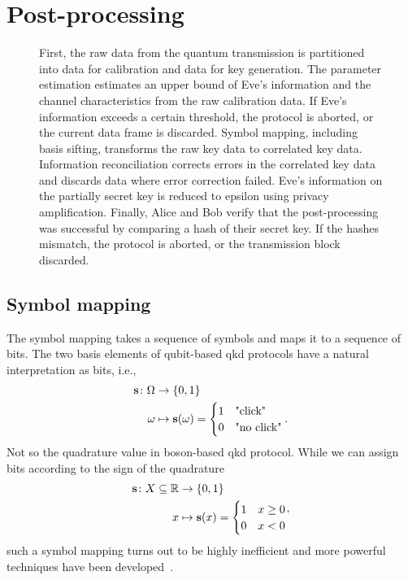 \section{Post-processing}

\begin{figure}[htb]
	\centering
	
	\caption{First, the raw data from the quantum transmission is partitioned into data for calibration and data for key generation. The parameter estimation estimates an upper bound of Eve's information and the channel characteristics from the raw calibration data. If Eve's information exceeds a certain threshold, the protocol is aborted, or the current data frame is discarded. Symbol mapping, including basis sifting, transforms the raw key data to correlated key data. Information reconciliation corrects errors in the correlated key data and discards data where error correction failed. Eve's information on the partially secret key is reduced to epsilon using privacy amplification. Finally, Alice and Bob verify that the post-processing was successful by comparing a hash of their secret key. If the hashes mismatch, the protocol is aborted, or the transmission block discarded.}\label{fig:post_processing}
\end{figure}

\FloatBarrier
\subsection{Symbol mapping}

The symbol mapping takes a sequence of symbols and maps it to a sequence of bits.
The two basis elements of qubit-based \gls{qkd} protocols have a natural interpretation as bits, i.e.,
\begin{equation}
	\begin{split}
		\vb{s}\colon\Omega&\to\{0,1\} \\
		\omega &\mapsto \vb{s}(\omega)
		=
		\begin{cases}
			1 & \text{"click"} \\
			0 & \text{"no click"}
		\end{cases}
		.
	\end{split}
\end{equation}
Not so the quadrature value in boson-based \gls{qkd} protocol.
While we can assign bits according to the sign of the quadrature
\begin{equation}
	\begin{split}
		\vb{s}\colon X\subseteq\mathbb{R}&\to\{0,1\} \\
		x &\mapsto \vb{s}(x)
		=
		\begin{cases}
			1 & x\geq0 \\
			0 & x<0
		\end{cases}
	\end{split}
	,
\end{equation}
such a symbol mapping turns out to be highly inefficient and more powerful techniques have been developed~\cite{VanAsche2004,Leverrier2008}.

